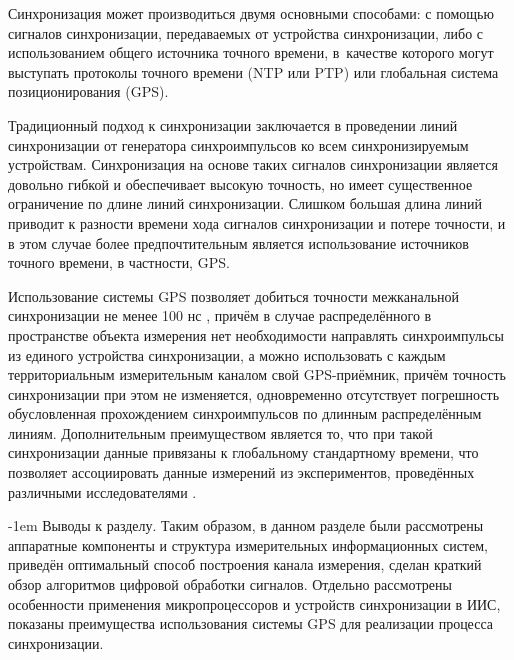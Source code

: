 \documentclass[a4paper, 14pt, titlepage]{extarticle}
\makeatletter
\renewcommand{\paragraph}{%
    \@startsection{paragraph}{4}%
    {\parindent}{\z@}{-1em}%
    {\normalfont\normalsize\bfseries}%
  }
\makeatother
\begin{document}
  Синхронизация может производиться двумя основными способами: с помощью сигналов синхронизации,
  передаваемых от устройства синхронизации, либо с использованием общего источника точного времени,
  в~качестве которого могут выступать протоколы точного времени (NTP или PTP) или глобальная система
  позиционирования (GPS).

  Традиционный подход к синхронизации заключается в проведении линий синхронизации от генератора
  синхроимпульсов ко всем синхронизируемым устройствам. Синхронизация на основе таких сигналов
  синхронизации является довольно гибкой и обеспечивает высокую точность, но имеет существенное
  ограничение по длине линий синхронизации. Слишком большая длина линий приводит к разности времени
  хода сигналов синхронизации и потере точности, и в этом случае более предпочтительным является
  использование источников точного времени, в частности, GPS.


  Использование системы GPS
  позволяет добиться точности межканальной синхронизации не менее 100 нс \cite{lombardi-gps}, причём в случае
  распределённого в пространстве объекта измерения нет необходимости направлять синхроимпульсы из
  единого устройства синхронизации, а можно использовать с каждым территориальным измерительным
  каналом свой GPS-приёмник, причём точность синхронизации при этом не изменяется,
  одновременно отсутствует погрешность обусловленная прохождением синхроимпульсов по длинным
  распределённым линиям. Дополнительным преимуществом является то, что при такой синхронизации
  данные привязаны к глобальному стандартному времени, что позволяет ассоциировать данные измерений
  из экспериментов, проведённых различными исследователями \cite{veggeberg-sync}.


  \paragraph{Выводы к разделу.}
  Таким образом, в данном разделе были рассмотрены аппаратные компоненты и структура измерительных
  информационных систем, приведён оптимальный способ построения канала измерения, сделан
  краткий обзор алгоритмов цифровой обработки сигналов. Отдельно
  рассмотрены особенности применения микропроцессоров и устройств синхронизации в ИИС,
  показаны преимущества использования системы GPS для реализации процесса синхронизации.
\end{document}
